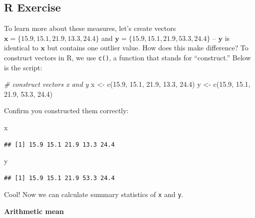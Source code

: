 \documentclass[
]{book}
\newenvironment{Shaded}{\begin{snugshade}}{\end{snugshade}}
\newcommand{\CommentTok}[1]{\textcolor[rgb]{0.56,0.35,0.01}{\textit{#1}}}
\newcommand{\FloatTok}[1]{\textcolor[rgb]{0.00,0.00,0.81}{#1}}
\newcommand{\FunctionTok}[1]{\textcolor[rgb]{0.00,0.00,0.00}{#1}}
\newcommand{\NormalTok}[1]{#1}
\newcommand{\OtherTok}[1]{\textcolor[rgb]{0.56,0.35,0.01}{#1}}
\begin{document}
\hypertarget{r-exercise}{%
\subsection{R Exercise}\label{r-exercise}}

To learn more about these measures, let's create vectors \(\pmb{x} = \{15.9, 15.1, 21.9, 13.3, 24.4\}\) and \(\pmb{y} = \{15.9, 15.1, 21.9, 53.3, 24.4\}\) -- \(\pmb{y}\) is identical to \(\pmb{x}\) but contains one outlier value. How does this make difference? To construct vectors in R, we use \texttt{c()}, a function that stands for ``construct.'' Below is the script:

\begin{Shaded}
\begin{Highlighting}[]
\CommentTok{\# construct vectors x and y}
\NormalTok{x }\OtherTok{\textless{}{-}} \FunctionTok{c}\NormalTok{(}\FloatTok{15.9}\NormalTok{, }\FloatTok{15.1}\NormalTok{, }\FloatTok{21.9}\NormalTok{, }\FloatTok{13.3}\NormalTok{, }\FloatTok{24.4}\NormalTok{)}
\NormalTok{y }\OtherTok{\textless{}{-}} \FunctionTok{c}\NormalTok{(}\FloatTok{15.9}\NormalTok{, }\FloatTok{15.1}\NormalTok{, }\FloatTok{21.9}\NormalTok{, }\FloatTok{53.3}\NormalTok{, }\FloatTok{24.4}\NormalTok{)}
\end{Highlighting}
\end{Shaded}

Confirm you constructed them correctly:

\begin{Shaded}
\begin{Highlighting}[]
\NormalTok{x}
\end{Highlighting}
\end{Shaded}

\begin{verbatim}
## [1] 15.9 15.1 21.9 13.3 24.4
\end{verbatim}

\begin{Shaded}
\begin{Highlighting}[]
\NormalTok{y}
\end{Highlighting}
\end{Shaded}

\begin{verbatim}
## [1] 15.9 15.1 21.9 53.3 24.4
\end{verbatim}

Cool! Now we can calculate summary statistics of \texttt{x} and \texttt{y}.

\textbf{Arithmetic mean}
\end{document}

